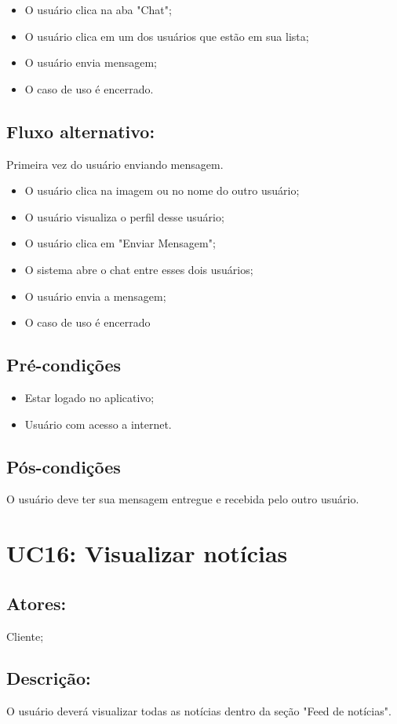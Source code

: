 \begin{itemize}
    \item O usuário clica na aba "Chat";
    \item O usuário clica em um dos usuários que estão em sua lista;
    \item O usuário envia mensagem;
    \item O caso de uso é encerrado. 
\end{itemize}
\subsection{Fluxo alternativo:}
Primeira vez do usuário enviando mensagem. 
\begin{itemize}
    \item O usuário clica na imagem ou no nome do outro usuário;
    \item O usuário visualiza o perfil desse usuário;
    \item O usuário clica em "Enviar Mensagem";
    \item O sistema abre o chat entre esses dois usuários;
    \item O usuário envia a mensagem;
    \item O caso de uso é encerrado 
\end{itemize}

\subsection{Pré-condições}
\begin{itemize}
    \item  Estar logado no aplicativo;
    \item Usuário com acesso a internet. 
\end{itemize}
\subsection{Pós-condições}
O usuário deve ter sua mensagem entregue e recebida pelo outro usuário. 
\section{UC16: Visualizar notícias}

\subsection{Atores:}
Cliente;
\subsection{Descrição:}
O usuário deverá visualizar todas as notícias dentro da seção "Feed de notícias". 
